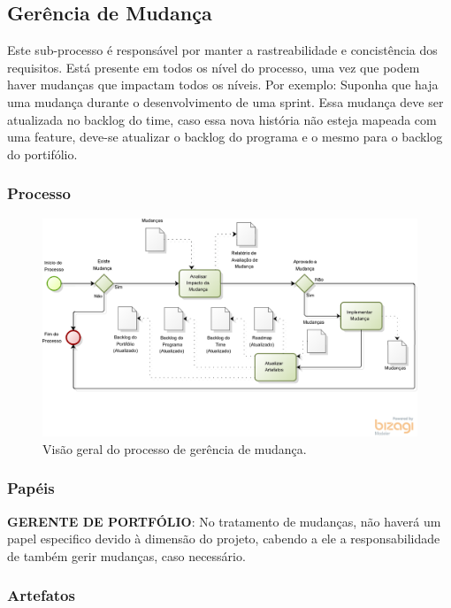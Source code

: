 \subsection{Gerência de Mudança}\label{sec:gerencia}

  Este sub-processo é responsável por manter a rastreabilidade e concistência dos requisitos.
  Está presente em todos os nível do processo, uma vez que podem haver mudanças que impactam todos
  os níveis. Por exemplo: Suponha que haja uma mudança durante o desenvolvimento de uma sprint.
  Essa mudança deve ser atualizada no backlog do time, caso essa nova história não esteja mapeada com
  uma feature, deve-se atualizar o backlog do programa e o mesmo para o backlog do portifólio.

\subsubsection{Processo}
  \begin{figure}[H]
      \centering
    \includegraphics[keepaspectratio=true,scale=0.6]{figuras/gerencia.eps}
      \caption{Visão geral do processo de gerência de mudança.}
      \label{fig:gerencia}
  \end{figure}

\subsubsection{Papéis}

  \textbf{GERENTE DE PORTFÓLIO}: No tratamento de mudanças, não haverá um papel especifico devido
à dimensão do projeto, cabendo a ele a responsabilidade de também gerir mudanças, caso necessário.

\subsubsection{Artefatos}

